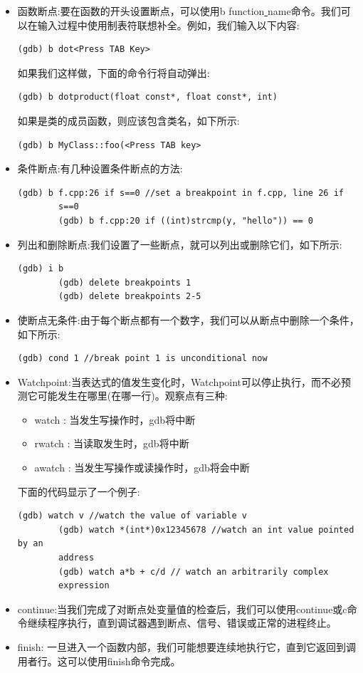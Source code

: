 \begin{itemize}
	\item 函数断点:要在函数的开头设置断点，可以使用b function\underline{ }name命令。我们可以在输入过程中使用制表符联想补全。例如，我们输入以下内容:
	\begin{lstlisting}[caption={}]
		(gdb) b dot<Press TAB Key>
	\end{lstlisting}
	如果我们这样做，下面的命令行将自动弹出:
	\begin{lstlisting}[caption={}]
		(gdb) b dotproduct(float const*, float const*, int)
	\end{lstlisting}
	如果是类的成员函数，则应该包含类名，如下所示:
	\begin{lstlisting}[caption={}]
		(gdb) b MyClass::foo(<Press TAB key>
	\end{lstlisting}
	\item 条件断点:有几种设置条件断点的方法:
	\begin{lstlisting}[caption={}]
		(gdb) b f.cpp:26 if s==0 //set a breakpoint in f.cpp, line 26 if
		s==0
		(gdb) b f.cpp:20 if ((int)strcmp(y, "hello")) == 0
	\end{lstlisting}
	\item 列出和删除断点:我们设置了一些断点，就可以列出或删除它们，如下所示:
	\begin{lstlisting}[caption={}]
		(gdb) i b
		(gdb) delete breakpoints 1
		(gdb) delete breakpoints 2-5
	\end{lstlisting}
	\item 使断点无条件:由于每个断点都有一个数字，我们可以从断点中删除一个条件，如下所示:
	\begin{lstlisting}[caption={}]
		(gdb) cond 1 //break point 1 is unconditional now
	\end{lstlisting}
	\item Watchpoint:当表达式的值发生变化时，Watchpoint可以停止执行，而不必预测它可能发生在哪里(在哪一行)。观察点有三种:
	\begin{itemize}
		\item watch : 当发生写操作时，gdb将中断
		\item rwatch : 当读取发生时，gdb将中断
		\item awatch : 当发生写操作或读操作时，gdb将会中断
	\end{itemize}
	下面的代码显示了一个例子:
	\begin{lstlisting}[caption={}]
		(gdb) watch v //watch the value of variable v
		(gdb) watch *(int*)0x12345678 //watch an int value pointed by an
		address
		(gdb) watch a*b + c/d // watch an arbitrarily complex
		expression
	\end{lstlisting}
	\item continue:当我们完成了对断点处变量值的检查后，我们可以使用continue或c命令继续程序执行，直到调试器遇到断点、信号、错误或正常的进程终止。
	\item finish: 一旦进入一个函数内部，我们可能想要连续地执行它，直到它返回到调用者行。这可以使用finish命令完成。
\end{itemize}

